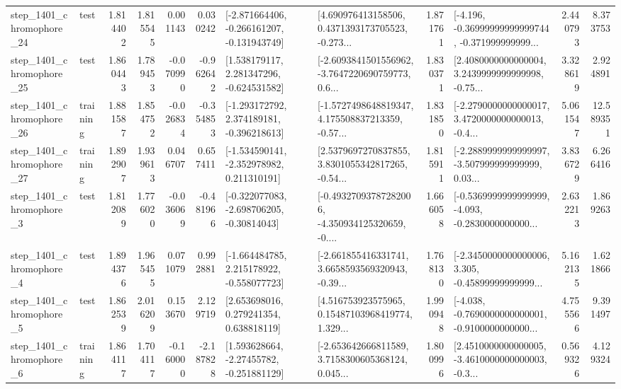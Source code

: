 \begin{tabular}{llrrrrllrlrr}
 step\_1401\_chromophore\_24 &      test &      1.814402 &    1.815545 &      0.001143 &  0.030242 &  [-2.871664406, -0.266161207, -0.131943749] &  [4.690976413158506, 0.4371393173705523, -0.273... &       1.871761 &  [-4.196, -0.36999999999999744, -0.371999999999... &            2.440793 &          8.373753 \\
 step\_1401\_chromophore\_25 &      test &      1.860443 &    1.789453 &     -0.070990 & -0.962642 &    [1.538179117, 2.281347296, -0.624531582] &  [-2.6093841501556962, -3.7647220690759773, 0.6... &       1.830371 &  [2.4080000000000004, 3.2439999999999998, -0.75... &            3.328619 &          2.924891 \\
 step\_1401\_chromophore\_26 &  training &      1.881587 &    1.854752 &     -0.026834 & -0.354853 &   [-1.293172792, 2.374189181, -0.396218613] &  [-1.5727498648819347, 4.175508837213359, -0.57... &       1.831850 &  [-2.2790000000000017, 3.4720000000000013, -0.4... &            5.061547 &         12.589351 \\
 step\_1401\_chromophore\_27 &  training &      1.892907 &    1.939613 &      0.046707 &  0.657411 &   [-1.534590141, -2.352978982, 0.211310191] &  [2.5379697270837855, 3.8301055342817265, -0.54... &       1.815911 &  [-2.2889999999999997, -3.507999999999999, 0.03... &            3.836729 &          6.266416 \\
  step\_1401\_chromophore\_3 &      test &      1.812089 &    1.776020 &     -0.036069 & -0.481966 &   [-0.322077083, -2.698706205, -0.30814043] &  [-0.49327093787282006, -4.350934125320659, -0.... &       1.666058 &  [-0.5369999999999999, -4.093, -0.2830000000000... &            2.632213 &          1.869263 \\
  step\_1401\_chromophore\_4 &      test &      1.894376 &    1.965455 &      0.071079 &  0.992881 &   [-1.664484785, 2.215178922, -0.558077723] &  [-2.661855416331741, 3.6658593569320943, -0.39... &       1.768130 &  [-2.3450000000000006, 3.305, -0.45899999999999... &            5.162135 &          1.621866 \\
  step\_1401\_chromophore\_5 &      test &      1.862539 &    2.016209 &      0.153670 &  2.129719 &     [2.653698016, 0.279241354, 0.638818119] &  [4.516753923575965, 0.15487103968419774, 1.329... &       1.990948 &  [-4.038, -0.7690000000000001, -0.9100000000000... &            4.755566 &          9.391497 \\
  step\_1401\_chromophore\_6 &  training &      1.864117 &    1.704117 &     -0.160000 & -2.187828 &    [1.593628664, -2.27455782, -0.251881129] &  [-2.653642666811589, 3.7158300605368124, 0.045... &       1.800996 &  [2.4510000000000005, -3.4610000000000003, -0.3... &            0.569326 &          4.129324 \\

\end{tabular}
